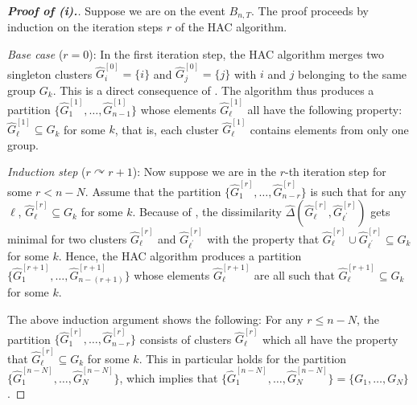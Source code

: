 \documentclass[12pt]{article}
\makeatletter
\renewcommand{\eqref}[1]{\tagform@{\ref{#1}}}
\makeatother
\begin{document}
\begin{proof}[\textnormal{\textbf{Proof of (i).}}]
Suppose we are on the event $B_{n,T}$. The proof proceeds by induction on the iteration steps $r$ of the HAC algorithm. 
\vspace{7pt}

\textit{Base case} ($r=0$): In the first iteration step, the HAC algorithm merges two singleton clusters $\widehat{G}_i^{[0]} = \{ i \}$ and $\widehat{G}_j^{[0]} = \{ j \}$ with $i$ and $j$ belonging to the same group $G_k$. This is a direct consequence of \eqref{eq1-prop-clustering-1}. The algorithm thus produces a partition $\{ \widehat{G}_1^{[1]},\ldots,\widehat{G}_{n-1}^{[1]} \}$ whose elements $\widehat{G}_\ell^{[1]}$ all have the following property: $\widehat{G}_\ell^{[1]} \subseteq G_k$ for some $k$, that is, each cluster $\widehat{G}_\ell^{[1]}$ contains elements from only one group. 
\vspace{7pt}

\textit{Induction step} ($r \curvearrowright r+1$): Now suppose we are in the $r$-th iteration step for some $r < n-N$. Assume that the partition $\{\widehat{G}_1^{[r]},\ldots,\widehat{G}_{n-r}^{[r]}\}$ is such that for any $\ell$, $\widehat{G}_\ell^{[r]} \subseteq G_k$ for some $k$. Because of \eqref{eq1-prop-clustering-1}, the dissimilarity $\widehat{\Delta}(\widehat{G}_\ell^{[r]},\widehat{G}_{\ell^\prime}^{[r]})$ gets minimal for two clusters $\widehat{G}_\ell^{[r]}$ and $\widehat{G}_{\ell^\prime}^{[r]}$ with the property that $\widehat{G}_\ell^{[r]} \cup \widehat{G}_{\ell^\prime}^{[r]} \subseteq G_k$ for some $k$. Hence, the HAC algorithm produces a partition $\{ \widehat{G}_1^{[r+1]},\ldots,\widehat{G}_{n-(r+1)}^{[r+1]} \}$ whose elements $\widehat{G}_\ell^{[r+1]}$ are all such that $\widehat{G}_\ell^{[r+1]} \subseteq G_k$ for some $k$. 
\vspace{7pt}

The above induction argument shows the following: For any $r \le n - N$, the partition $\{ \widehat{G}_1^{[r]},\ldots,\widehat{G}_{n-r}^{[r]} \}$ consists of clusters $\widehat{G}_\ell^{[r]}$ which all have the property that $\widehat{G}_\ell^{[r]} \subseteq G_k$ for some $k$. This in particular holds for the partition $\{ \widehat{G}_1^{[n-N]},\ldots,\widehat{G}_N^{[n-N]} \}$, which implies that $\{ \widehat{G}_1^{[n-N]},\ldots,\widehat{G}_N^{[n-N]} \} =\{ G_1,\ldots,G_N \}$.  
\end{proof}
\end{document}
